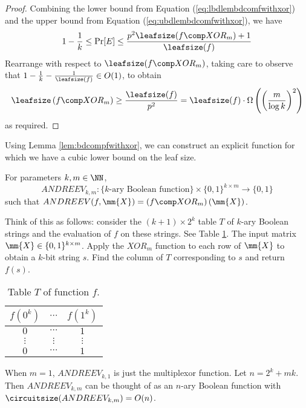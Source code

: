 \begin{proof}
	Combining the lower bound from Equation (\ref{eq:lbdlembdcomfwithxor}) and the upper bound from Equation (\ref{eq:ubdlembdcomfwithxor}), we have
	\[1 - \frac{1}{k} \leq \Pr[E] \leq \frac{p^2\leafsize(f \comp XOR_m) + 1}{\leafsize(f)}\]
	Rearrange with respect to $\leafsize(f \comp XOR_m)$, taking care to observe that $1 - \frac{1}{k} - \frac{1}{\leafsize(f)} \in O(1)$, to obtain
	\[\leafsize\left(f \comp XOR_m\right) \geq \frac{\leafsize(f)}{p^2} = \leafsize(f) \cdot \Omega\left(\left(\frac{m}{\log k}\right)^2\right)\]
	as required. 
\end{proof}

Using Lemma \ref{lem:bdcompfwithxor}, we can construct an explicit function for which we have a cubic lower bound on the leaf size.
\begin{definition}
	For parameters $k, m \in \NN$,
	\[ANDREEV_{k,m}: \{\mbox{$k$-ary Boolean function}\} \times \{0,1\}^{k\times m} \rightarrow \{0,1\}\] 
	such that $ANDREEV(f, \mm{X}) = \left(f\comp XOR_m\right)(\mm{X})$.
	
	Think of this as follows: consider the $(k + 1) \times 2^{k}$ table $T$ of $k$-ary Boolean strings and the evaluation of $f$ on these strings. See Table \ref{table:andreev}. The input matrix $\mm{X} \in \{0,1\}^{k \times m}$. Apply the $XOR_m$ function to each row of $\mm{X}$ to obtain a $k$-bit string $s$. Find the column of $T$ corresponding to $s$ and return $f(s)$.
	\begin{table}[!ht]
		\centering
		\begin{tabular}{|c|c|c|}
			\hline
			$f(0^k)$ & $\cdots$ & $f(1^k)$\\
			\hline
			$0$ & $\cdots$ & $1$\\
			$\vdots$ & $\vdots$ & $\vdots$\\
			$0$ & $\cdots$ & $1$\\
			\hline
		\end{tabular}
		\caption{Table $T$ of function $f$.}
		\label{table:andreev}
	\end{table}	
\end{definition}
When $m = 1$, $ANDREEV_{k,1}$ is just the multiplexor function. Let $n = 2^k + mk$. Then $ANDREEV_{k,m}$ can be thought of as an $n$-ary Boolean function with $\circuitsize(ANDREEV_{k, m}) = O(n)$. 

